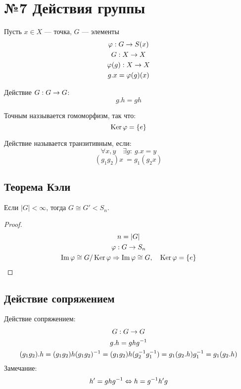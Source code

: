 \section{№7 Действия группы}

\begin{example}
  Пусть $x \in X$ --- точка, $G$ --- элементы
  \begin{gather}
    \varphi: G \rightarrow S(x) \\
    G: X \rightarrow X \\
    \varphi(g): X \rightarrow X \\
    g.x = \varphi(g)(x)
  \end{gather}
\end{example}

\begin{proposition}
  Действие $G: G \rightarrow G$:
  \[g.h = gh\]
\end{proposition}

\begin{definition}
  Точным наззывается гомоморфизм, так что:
  \[\operatorname{Ker} \varphi = \{ e \}\]
\end{definition}

\begin{definition}[?]
  Действие называется транзитивным, если:
  \[\forall x, y \quad \exists g: \ g.x = y\]
  \[(g_1 g_2)x \ = g_1 (g_2 x)\]
\end{definition}

\subsection{Теорема Кэли}

\begin{theorem}[Кэли]
  Если $|G| < \infty$, тогда $G \cong G' < S_n$.
\end{theorem}

\begin{proof}
  \begin{gather}
    n = |G| \\
    \varphi: G \rightarrow S_n \\
    \operatorname{Im} \varphi \cong G / \operatorname{Ker} \varphi \Rightarrow \operatorname{Im} \varphi \cong G, \quad \operatorname{Ker} \varphi = \{ e \}
  \end{gather}
\end{proof}

\subsection{Действие сопряжением}

\begin{definition}
  Действие сопряжением:
  \begin{gather}
    G: G \rightarrow G \\
    g.h = gh g^{-1} \\
    (g_1 g_2).h = (g_1 g_2)h(g_1 g_2)^{-1} = (g_1 g_2)h(g_2^{-1} g_1^{-1}) = g_1 (g_2.h) g_1^{-1} = g_1 (g_2.h)
  \end{gather}
  Замечание:
  \[ h' = ghg^{-1} \Leftrightarrow h = g^{-1} h' g\]
\end{definition}

